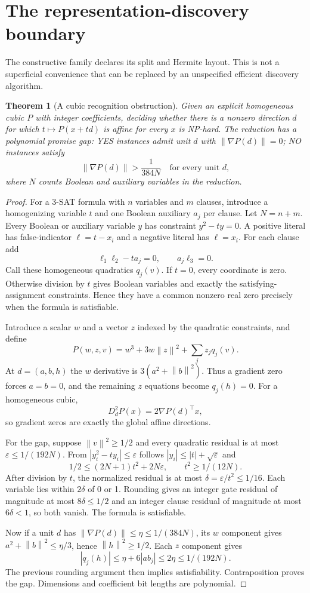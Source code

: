 \documentclass[11pt]{article}
\newcommand{\norm}[1]{\left\lVert#1\right\rVert}
\newtheorem{theorem}{Theorem}
\begin{document}
\section{The representation-discovery boundary}

The constructive family declares its split and Hermite layout. This is not a superficial convenience that can be replaced by an unspecified efficient discovery algorithm.

\begin{theorem}[A cubic recognition obstruction]
Given an explicit homogeneous cubic $P$ with integer coefficients, deciding whether there is a nonzero direction $d$ for which $t\mapsto P(x+td)$ is affine for every $x$ is NP-hard. The reduction has a polynomial promise gap: YES instances admit unit $d$ with $\norm{\nabla P(d)}=0$; NO instances satisfy
\[
\norm{\nabla P(d)}>\frac1{384N}\quad\text{for every unit }d,
\]
where $N$ counts Boolean and auxiliary variables in the reduction.
\end{theorem}

\begin{proof}
For a 3-SAT formula with $n$ variables and $m$ clauses, introduce a homogenizing variable $t$ and one Boolean auxiliary $a_j$ per clause. Let $N=n+m$. Every Boolean or auxiliary variable $y$ has constraint $y^2-ty=0$. A positive literal has false-indicator $\ell=t-x_i$ and a negative literal has $\ell=x_i$. For each clause add
\[
\ell_1\ell_2-ta_j=0,\qquad a_j\ell_3=0.
\]
Call these homogeneous quadratics $q_j(v)$. If $t=0$, every coordinate is zero. Otherwise division by $t$ gives Boolean variables and exactly the satisfying-assignment constraints. Hence they have a common nonzero real zero precisely when the formula is satisfiable.

Introduce a scalar $w$ and a vector $z$ indexed by the quadratic constraints, and define
\[
P(w,z,v)=w^3+3w\norm z^2+\sum_j z_jq_j(v).
\]
At $d=(a,b,h)$ the $w$ derivative is $3(a^2+\norm b^2)$. Thus a gradient zero forces $a=b=0$, and the remaining $z$ equations become $q_j(h)=0$. For a homogeneous cubic,
\[
D_d^2P(x)=2\nabla P(d)^\top x,
\]
so gradient zeros are exactly the global affine directions.

For the gap, suppose $\norm v^2\ge1/2$ and every quadratic residual is at most $\varepsilon\le1/(192N)$. From $|y_i^2-ty_i|\le\varepsilon$ follows $|y_i|\le|t|+\sqrt\varepsilon$ and
\[
1/2\le(2N+1)t^2+2N\varepsilon,
\qquad t^2\ge1/(12N).
\]
After division by $t$, the normalized residual is at most $\delta=\varepsilon/t^2\le1/16$. Each variable lies within $2\delta$ of 0 or 1. Rounding gives an integer gate residual of magnitude at most $8\delta\le1/2$ and an integer clause residual of magnitude at most $6\delta<1$, so both vanish. The formula is satisfiable.

Now if a unit $d$ has $\norm{\nabla P(d)}\le\eta\le1/(384N)$, its $w$ component gives $a^2+\norm b^2\le\eta/3$, hence $\norm h^2\ge1/2$. Each $z$ component gives
\[
|q_j(h)|\le\eta+6|ab_j|\le2\eta\le1/(192N).
\]
The previous rounding argument then implies satisfiability. Contraposition proves the gap. Dimensions and coefficient bit lengths are polynomial.
\end{proof}
\end{document}
